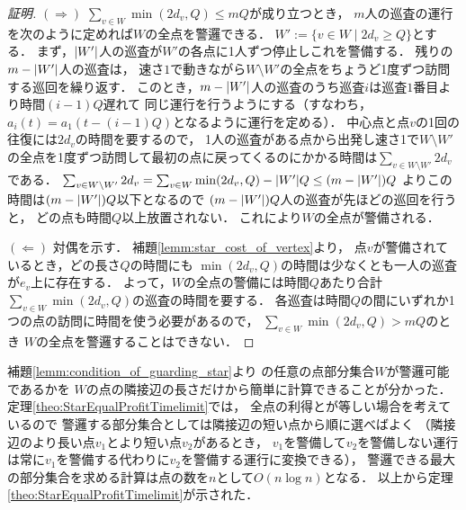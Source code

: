\begin{proof}[証明]
$(\Rightarrow)$
$\sum_{v \in W} \min(2d_v, Q) \leq mQ$が成り立つとき，
$m$人の巡査の運行を次のように定めれば$W$の全点を警邏できる．
$W' := \{ v \in W \mid 2d_v \geq Q \}$とする．
まず，$\lvert{W'}\rvert$人の巡査が$W'$の各点に1人ずつ停止しこれを警備する．
残りの$m - \lvert{W'}\rvert$人の巡査は，
速さ$1$で動きながら$W \setminus W'$の全点をちょうど1度ずつ訪問する巡回を繰り返す．
このとき，$m - \lvert{W'}\rvert$人の巡査のうち巡査$i$は巡査$1$番目より時間$(i - 1)Q$遅れて
同じ運行を行うようにする（すなわち，$a_i(t) = a_1(t - (i - 1)Q)$となるように運行を定める）．
中心点と点$v$の1回の往復には$2d_v$の時間を要するので，
1人の巡査がある点から出発し速さ1で$W \setminus W'$の全点を1度ずつ訪問して最初の点に戻ってくるのにかかる時間は$\sum_{v \in W \setminus W'} 2d_v$である．
$\sum_{v \in W \setminus W'} 2d_v
= \sum_{v \in W} \min(2d_v, Q) - |W'|Q
\leq (m - \lvert{W'}\rvert)Q$
よりこの時間は$(m - \lvert{W'}\rvert)Q$以下となるので
$(m - \lvert{W'}\rvert)Q$人の巡査が先ほどの巡回を行うと，
どの点も時間$Q$以上放置されない．
これにより$W$の全点が警備される．

$(\Leftarrow)$
対偶を示す．
補題\ref{lemm:star_cost_of_vertex}より，
点$v$が警備されているとき，どの長さ$Q$の時間にも
$\min(2d_v, Q)$の時間は少なくとも一人の巡査が$e_v$上に存在する．
よって，$W$の全点の警備には時間$Q$あたり合計$\sum_{v \in W} \min(2d_v, Q)$の巡査の時間を要する．
各巡査は時間$Q$の間にいずれか1つの点の訪問に時間を使う必要があるので，
$\sum_{v \in W} \min(2d_v, Q) > mQ$のとき
$W$の全点を警邏することはできない．
\end{proof}


補題\ref{lemm:condition_of_guarding_star}より
{\graphStar}の任意の点部分集合$W$が警邏可能であるかを
$W$の点の隣接辺の長さだけから簡単に計算できることが分かった．
定理\ref{theo:StarEqualProfitTimelimit}では，
全点の利得と{\idletime}が等しい場合を考えているので
警邏する部分集合としては隣接辺の短い点から順に選べばよく
（隣接辺のより長い点$v_1$とより短い点$v_2$があるとき，
$v_1$を警備して$v_2$を警備しない運行は常に$v_1$を警備する代わりに$v_2$を警備する運行に変換できる），
警邏できる最大の部分集合を求める計算は点の数を$n$として$O(n \log n)$となる．
以上から定理\ref{theo:StarEqualProfitTimelimit}が示された．
